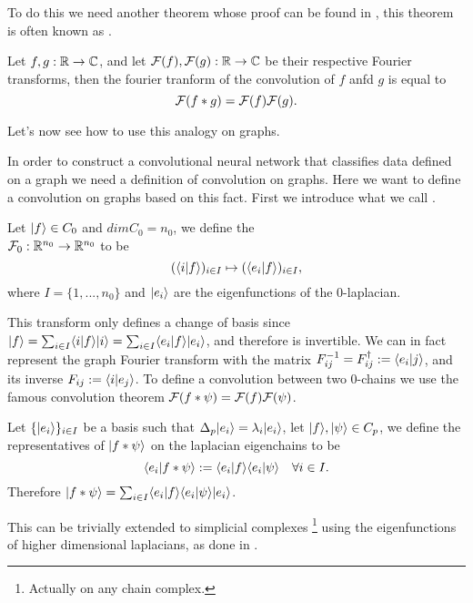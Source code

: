 \documentclass[../3.tex]{subfiles}
\begin{document}
{    To do this we need another theorem whose proof can be found in \cite{fourier}, this theorem is often known as .

    \begin{thm}
        Let $f,g : \mathbb{R} \to \mathbb{C}$, and let $\mathcal{F}(f), \mathcal{F}(g) : \mathbb{R} \to \mathbb{C}$ be their respective Fourier transforms, then the fourier tranform of the convolution of $f$ anfd $g$ is equal to
        \[ \mathcal{F}(f * g) = \mathcal{F}(f)\mathcal{F}(g) . \]
    \end{thm}  
    
    Let's now see how to use this analogy on graphs.
    
    }

    In order to construct a convolutional neural network that classifies data defined on a graph we need a definition of convolution on graphs.
    Here we want to define a convolution on graphs based on this fact. First we introduce what we call .
    
    \begin{defn}
        Let $| f \rangle \in C_0$ and $dimC_0 = n_0$, we define the \\
        $\mathcal{F}_0 : \mathbb{R}^{n_0} \to \mathbb{R}^{n_0}$ to be
        \[ (\langle i | f \rangle)_{i \in I} \mapsto (\langle e_i | f \rangle)_{i \in I},\]
        where $I = \{1,...,n_0\}$ and $| e_i \rangle$ are the eigenfunctions of the $0$-laplacian.
    \end{defn}

    This transform only defines a change of basis since $| f \rangle = \sum_{i \in I}\langle i | f \rangle| i \rangle = \sum_{i \in I}\langle e_i | f \rangle| e_i \rangle$, and therefore is invertible.
    We can in fact represent the graph Fourier transform with the matrix $F^{-1}_{ij} = F^\dagger_{ij} := \langle e_i | j \rangle$, and its inverse $F_{ij} := \langle i | e_j \rangle$.
    To define a convolution between two $0$-chains we use the famous convolution theorem $\mathcal{F}(f * \psi) = \mathcal{F}(f)\mathcal{F}(\psi)$. 

    \begin{defn}
        Let $\{| e_i \rangle\}_{i \in I}$ be a basis such that $\Delta_p| e_i \rangle = \lambda_i| e_i \rangle$, let $| f \rangle,| \psi \rangle \in C_p$, we define the representatives of $| f * \psi \rangle$ on
        the laplacian eigenchains to be 
        \[ \langle e_i | f * \psi \rangle := \langle e_i | f \rangle\langle e_i | \psi \rangle \quad \forall i \in I.\]
        Therefore $| f * \psi \rangle = \sum_{i \in I}\langle e_i | f \rangle\langle e_i | \psi \rangle| e_i \rangle$.
    \end{defn}

    This can be trivially extended to simplicial complexes \footnote{Actually on any chain complex.} using the eigenfunctions of higher dimensional laplacians, as done in \cite{simplicialNN}.
\end{document}
